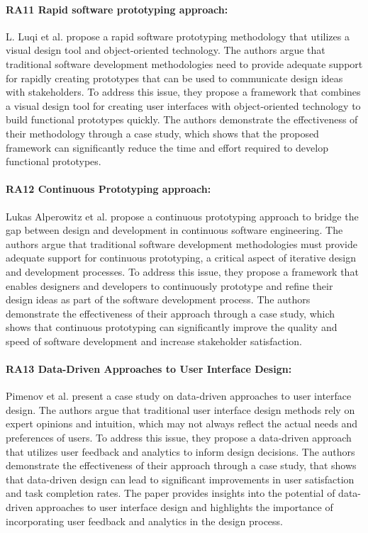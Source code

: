 \paragraph{RA11 Rapid software prototyping approach:}
L. Luqi et al. \cite{paper:prototyping:luqi} propose a rapid software prototyping methodology that utilizes a visual design tool and object-oriented technology. 
The authors argue that traditional software development methodologies need to provide adequate support for rapidly creating prototypes that can be used to communicate design ideas with stakeholders. 
To address this issue, they propose a framework that combines a visual design tool for creating user interfaces with object-oriented technology to build functional prototypes quickly. 
The authors demonstrate the effectiveness of their methodology through a case study, which shows that the proposed framework can significantly reduce the time and effort required to develop functional prototypes.

\paragraph{RA12 Continuous Prototyping approach:}
Lukas Alperowitz et al. \cite{misc:prototyping:lukas} propose a continuous prototyping approach to bridge the gap between design and development in continuous software engineering. 
The authors argue that traditional software development methodologies must provide adequate support for continuous prototyping, a critical aspect of iterative design and development processes. 
To address this issue, they propose a framework that enables designers and developers to continuously prototype and refine their design ideas as part of the software development process. 
The authors demonstrate the effectiveness of their approach through a case study, which shows that continuous prototyping can significantly improve the quality and speed of software development and increase stakeholder satisfaction.

\paragraph{RA13 Data-Driven Approaches to User Interface Design:}
Pimenov et al. \cite{misc:data-driven:pimenov} present a case study on data-driven approaches to user interface design. 
The authors argue that traditional user interface design methods rely on expert opinions and intuition, which may not always reflect the actual needs and preferences of users. 
To address this issue, they propose a data-driven approach that utilizes user feedback and analytics to inform design decisions. 
The authors demonstrate the effectiveness of their approach through a case study, that shows that data-driven design can lead to significant improvements in user satisfaction and task completion rates. 
The paper provides insights into the potential of data-driven approaches to user interface design and highlights the importance of incorporating user feedback and analytics in the design process.

